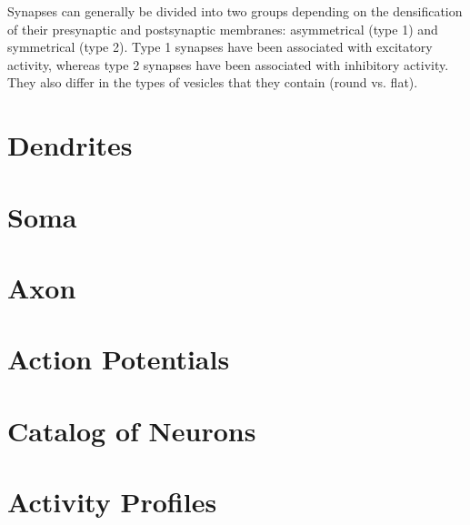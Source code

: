 Synapses can generally be divided into two groups depending on the densification of their presynaptic and postsynaptic membranes: asymmetrical (type 1) and symmetrical (type 2). Type 1 synapses have been associated with excitatory activity, whereas type 2 synapses have been associated with inhibitory activity. They also differ in the types of vesicles that they contain (round vs. flat).  


\section{Dendrites}




\section{Soma}


\section{Axon}


\section{Action Potentials}


\section{Catalog of Neurons}


\section{Activity Profiles}

